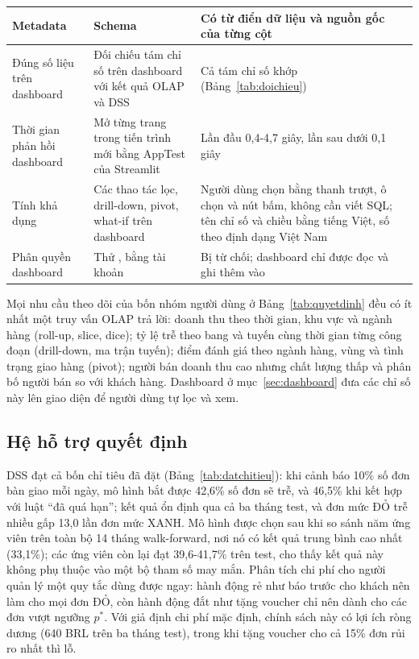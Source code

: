 \begin{longtable}{|P{3.0cm}|>{\raggedright\arraybackslash}p{5.2cm}|>{\raggedright\arraybackslash}p{5.5cm}|}
Metadata & Schema  & Có từ điển dữ liệu và nguồn gốc của từng cột\\ \hline
Đúng số liệu trên dashboard & Đối chiếu tám chỉ số trên dashboard với kết quả OLAP và DSS & Cả tám chỉ số khớp (Bảng~\ref{tab:doichieu})\\ \hline
Thời gian phản hồi dashboard & Mở từng trang trong tiến trình mới bằng AppTest của Streamlit & Lần đầu 0,4-4,7 giây, lần sau dưới 0,1 giây\\ \hline
Tính khả dụng & Các thao tác lọc, drill-down, pivot, what-if trên dashboard & Người dùng chọn bằng thanh trượt, ô chọn và nút bấm, không cần viết SQL; tên chỉ số và chiều bằng tiếng Việt, số theo định dạng Việt Nam\\ \hline
Phân quyền dashboard & Thử ,  bằng tài khoản  & Bị từ chối; dashboard chỉ được đọc và ghi thêm vào \\ \hline
\end{longtable}
\endgroup

Mọi nhu cầu theo dõi của bốn nhóm người dùng ở Bảng~\ref{tab:quyetdinh} đều có ít nhất một truy vấn OLAP trả lời: doanh thu theo thời gian, khu vực và ngành hàng (roll-up, slice, dice); tỷ lệ trễ theo bang và tuyến cùng thời gian từng công đoạn (drill-down, ma trận tuyến); điểm đánh giá theo ngành hàng, vùng và tình trạng giao hàng (pivot); người bán doanh thu cao nhưng chất lượng thấp và phân bố người bán so với khách hàng. Dashboard ở mục~\ref{sec:dashboard} đưa các chỉ số này lên giao diện để người dùng tự lọc và xem.

\subsection{Hệ hỗ trợ quyết định}

DSS đạt cả bốn chỉ tiêu đã đặt (Bảng~\ref{tab:datchitieu}): khi cảnh báo 10\% số đơn bàn giao mỗi ngày, mô hình bắt được 42,6\% số đơn sẽ trễ, và 46,5\% khi kết hợp với luật ``đã quá hạn''; kết quả ổn định qua cả ba tháng test, và đơn mức ĐỎ trễ nhiều gấp 13,0 lần đơn mức XANH. Mô hình được chọn sau khi so sánh năm ứng viên trên toàn bộ 14 tháng walk-forward, nơi nó có kết quả trung bình cao nhất (33,1\%); các ứng viên còn lại đạt 39,6-41,7\% trên test, cho thấy kết quả này không phụ thuộc vào một bộ tham số may mắn. Phân tích chi phí cho người quản lý một quy tắc dùng được ngay: hành động rẻ như báo trước cho khách nên làm cho mọi đơn ĐỎ, còn hành động đắt như tặng voucher chỉ nên dành cho các đơn vượt ngưỡng $p^{*}$. Với giả định chi phí mặc định, chính sách này có lợi ích ròng dương (640 BRL trên ba tháng test), trong khi tặng voucher cho cả 15\% đơn rủi ro nhất thì lỗ.

